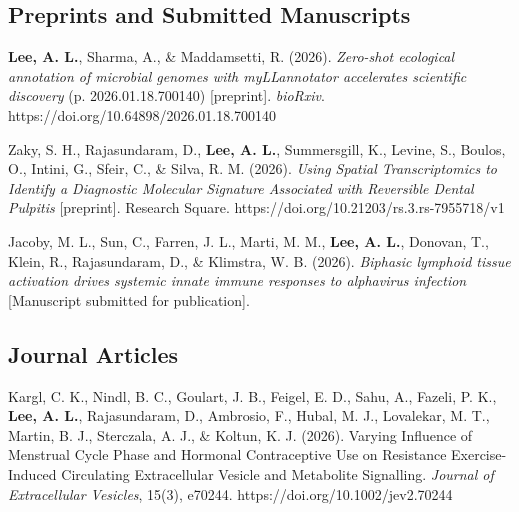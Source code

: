 \documentclass[11pt,letterpaper]{report} %
\begin{document}
    \subsection*{Preprints and Submitted Manuscripts}

    \begin{tablist}

        
        \item[2026] \textbf{Lee, A. L.}, Sharma, A., \& Maddamsetti, R. (2026). \textit{Zero-shot ecological annotation of microbial genomes with myLLannotator accelerates scientific discovery} (p. 2026.01.18.700140) [preprint]. \textit{bioRxiv}. https://doi.org/10.64898/2026.01.18.700140
        \item[2026] Zaky, S. H., Rajasundaram, D., \textbf{Lee, A. L.}, Summersgill, K., Levine, S., Boulos, O., Intini, G., Sfeir, C., \& Silva, R. M. (2026). \textit{Using Spatial Transcriptomics to Identify a Diagnostic Molecular Signature Associated with Reversible Dental Pulpitis} [preprint]. Research Square. https://doi.org/10.21203/rs.3.rs-7955718/v1
        
        \item[2026] Jacoby, M. L., Sun, C., Farren, J. L., Marti, M. M., \textbf{Lee, A. L.}, Donovan, T., Klein, R., Rajasundaram, D., \& Klimstra, W. B. (2026). \textit{Biphasic lymphoid tissue activation drives systemic innate immune responses to alphavirus infection} [Manuscript submitted for publication].

    \end{tablist}

    \subsection*{Journal Articles}

    \begin{tablist}
        \item[2026] Kargl, C. K., Nindl, B. C., Goulart, J. B., Feigel, E. D., Sahu, A., Fazeli, P. K., \textbf{Lee, A. L.}, Rajasundaram, D., Ambrosio, F., Hubal, M. J., Lovalekar, M. T., Martin, B. J., Sterczala, A. J., \& Koltun, K. J. (2026). Varying Influence of Menstrual Cycle Phase and Hormonal Contraceptive Use on Resistance Exercise-Induced Circulating Extracellular Vesicle and Metabolite Signalling. \textit{Journal of Extracellular Vesicles}, 15(3), e70244. https://doi.org/10.1002/jev2.70244
        
    \end{tablist}
\end{document}
